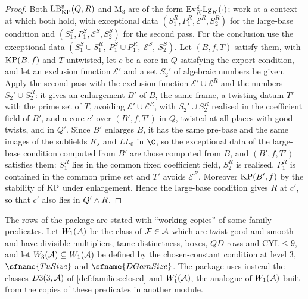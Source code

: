 \begin{proof}
Both $\mathrm{LB}^{\mathrm g}_{\mathrm{KP}}(Q,R)$ and $\mathrm{M}_3$ are of the form $\mathrm{Ev}^{\mathrm g}_K\mathrm{Lg}_K(\cdot)$; work at a
context at which both hold, with exceptional data $(S_1^R,P_1^R,\mathcal E^R,S_2^R)$ for the large-base condition and
$(S_1^S,P_1^S,\mathcal E^S,S_2^S)$ for the second pass. For the conclusion use the exceptional data
$(S_1^S\cup S_1^R,\ P_1^S\cup P_1^R,\ \mathcal E^S,\ S_2^S)$. Let $(B,f,T)$ satisfy them, with $\mathrm{KP}(B,f)$ and $T$
untwisted, let $c$ be a core in $Q$ satisfying the export condition, and let an exclusion function $\mathcal E'$ and a set
$S_2'$ of algebraic numbers be given. Apply the second pass with the exclusion function $\mathcal E'\cup\mathcal E^R$ and the
numbers $S_2'\cup S_2^R$: it gives an enlargement $B'$ of $B$, the same frame, a twisting datum $T'$ with the prime set of
$T$, avoiding $\mathcal E'\cup\mathcal E^R$, with $S_2'\cup S_2^R$ realised in the coefficient field of $B'$, and a core $c'$
over $(B',f,T')$ in $Q$, twisted at all places with good twists, and in $Q'$. Since $B'$ enlarges $B$, it has the same
pre-base and the same images of the subfields $K_s$ and $\mathit{LL}_0$ in $\C$, so the exceptional data of the large-base
condition computed from $B'$ are those computed from $B$, and $(B',f,T')$ satisfies them: $S_1^R$ lies in the common fixed
coefficient field, $S_2^R$ is realised, $P_1^R$ is contained in the common prime set and $T'$ avoids $\mathcal E^R$.
Moreover $\mathrm{KP}(B',f)$ by the stability of $\mathrm{KP}$ under enlargement. Hence the large-base condition gives $R$ at
$c'$, so that $c'$ also lies in $Q'\mathbin{\wedge} R$.
\end{proof}

The rows of the package are stated with ``working copies'' of some family predicates. Let $W_1(\mathcal{A})$ be the class of
$\mathcal{F}\in\mathcal{A}$ which are twist-good and smooth and have divisible multipliers, tame distinctness, boxes, $QD$-rows and
$\mathrm{CYL}\le9$, and let $W_3(\mathcal{A})\subseteq W_1(\mathcal{A})$ be defined by the chosen-constant condition at level $3$,
$\sfname{TuSize}$ and $\sfname{DGamSize}$. The package uses instead the classes $D3(3,\mathcal{A})$ of
\cref{def:families:closed} and $W'_1(\mathcal{A})$, the analogue of $W_1(\mathcal{A})$ built from the copies of these predicates in
another module.

